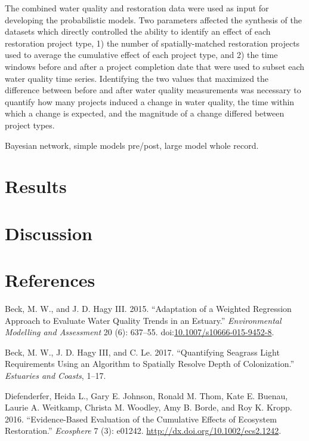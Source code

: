 \documentclass[]{article}
\begin{document}
The combined water quality and restoration data were used as input for
developing the probabilistic models. Two parameters affected the
synthesis of the datasets which directly controlled the ability to
identify an effect of each restoration project type, 1) the number of
spatially-matched restoration projects used to average the cumulative
effect of each project type, and 2) the time windows before and after a
project completion date that were used to subset each water quality time
series. Identifying the two values that maximized the difference between
before and after water quality measurements was necessary to quantify
how many projects induced a change in water quality, the time within
which a change is expected, and the magnitude of a change differed
between project types.

Bayesian network, simple models pre/post, large model whole record.

\section{Results}\label{results}

\section{Discussion}\label{discussion}

\section*{References}\label{references}

\hypertarget{refs}{}
\hypertarget{ref-Beck15}{}
Beck, M. W., and J. D. Hagy III. 2015. ``Adaptation of a Weighted
Regression Approach to Evaluate Water Quality Trends in an Estuary.''
\emph{Environmental Modelling and Assessment} 20 (6): 637--55.
doi:\href{https://doi.org/10.1007/s10666-015-9452-8}{10.1007/s10666-015-9452-8}.

\hypertarget{ref-Beck17c}{}
Beck, M. W., J. D. Hagy III, and C. Le. 2017. ``Quantifying Seagrass
Light Requirements Using an Algorithm to Spatially Resolve Depth of
Colonization.'' \emph{Estuaries and Coasts}, 1--17.

\hypertarget{ref-Diefenderfer16}{}
Diefenderfer, Heida L., Gary E. Johnson, Ronald M. Thom, Kate E. Buenau,
Laurie A. Weitkamp, Christa M. Woodley, Amy B. Borde, and Roy K. Kropp.
2016. ``Evidence-Based Evaluation of the Cumulative Effects of Ecosystem
Restoration.'' \emph{Ecosphere} 7 (3): e01242.
\url{http://dx.doi.org/10.1002/ecs2.1242}.
\end{document}
